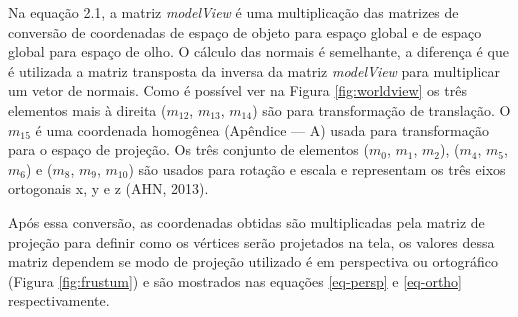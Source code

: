 	\begin{figure}[h!]
		\centering
	\end{figure}

Na equação 2.1, a matriz \textit{modelView} é uma multiplicação das matrizes de conversão de coordenadas de espaço de objeto para espaço global e de espaço global para espaço de olho. O cálculo das normais é semelhante, a diferença é que é utilizada a matriz transposta da inversa da matriz \textit{modelView} para multiplicar um vetor de normais. Como é possível ver na Figura \ref{fig:worldview} os três elementos mais à direita ($ m_{12} $, $ m_{13} $, $ m_{14} $) são para transformação de translação. O $ m_{15} $ é uma coordenada homogênea (Apêndice --- A) usada para transformação para o espaço de projeção. Os três conjunto de elementos ($ m_{0} $, $ m_{1} $, $ m_{2} $), ($ m_{4} $, $ m_{5} $, $ m_{6} $) e ($ m_{8} $, $ m_{9} $, $ m_{10} $) são usados para rotação e escala e representam os três eixos ortogonais x, y e z (AHN, 2013)\nocite{openglOnline}.

Após essa conversão, as coordenadas obtidas são multiplicadas pela matriz de projeção para definir como os vértices serão projetados na tela, os valores dessa matriz dependem se modo de projeção utilizado é em perspectiva ou ortográfico (Figura \ref{fig:frustum}) e são mostrados nas equações \ref{eq-persp} e \ref{eq-ortho} respectivamente. 

